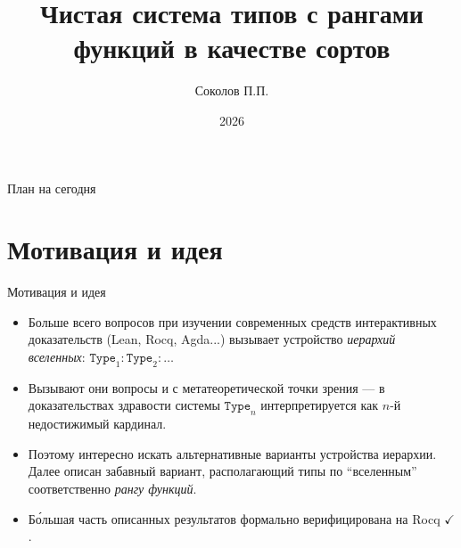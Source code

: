 \documentclass[russian]{beamer}
\title{Чистая система типов с рангами функций в качестве сортов}
\author{Соколов П.П.}
\institute{Высшая Школа Экономики}
\date{2026}
\begin{document}
\frame{\titlepage}
\begin{frame}{План на сегодня}
\tableofcontents
\end{frame}
\section{Мотивация и идея}
\begin{frame}{Мотивация и идея}
\begin{itemize}
\item Больше всего вопросов при изучении современных
    средств интерактивных доказательств (Lean, Rocq,
    Agda...) вызывает устройство \textit{иерархий
    вселенных}: $\mathtt{Type}_1 : \mathtt{Type}_2 :
    \ldots$
\item Вызывают они вопросы и с метатеоретической точки
    зрения --- в доказательствах здравости системы
    $\mathtt{Type}_n$ интерпретируется как $n$-й
    недостижимый кардинал.
\item Поэтому интересно искать альтернативные варианты
    устройства иерархии. Далее описан забавный вариант,
    располагающий типы по ``вселенным'' соответственно
    \textit{рангу функций}.
\item Б\'{о}льшая часть описанных результатов формально
    верифицирована на Rocq $\checkmark$.
\end{itemize}
\end{frame}
\end{document}
